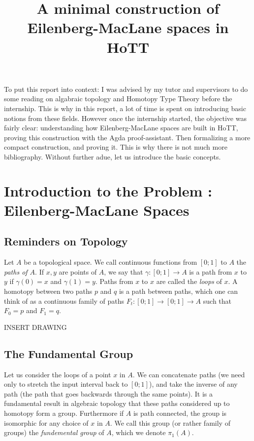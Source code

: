 \documentclass{article}
\title{A minimal construction of Eilenberg-MacLane spaces in HoTT}
\begin{document}
\tableofcontents

\break

To put this report into context: I was advised by my tutor and supervisors to do some reading on algabraic topology and Homotopy Type Theory before the internship. This is why in this report, a lot of time is spent on introducing basic notions from these fields. However once the internship started, the objective was fairly clear: understanding how Eilenberg-MacLane spaces are built in HoTT, proving this construction with the Agda proof-assistant. Then formalizing a more compact construction, and proving it. This is why there is not much more bibliography. Without further adue, let us introduce the basic concepts.

\section{Introduction to the Problem : Eilenberg-MacLane Spaces}

\subsection{Reminders on Topology}

Let $A$ be a topological space. We call continuous functions from $[0;1]$ to $A$ the \emph{paths of $A$}. If $x,y$ are points of $A$, we say that $\gamma : [0;1] \to A$ is a path from $x$ to $y$ if $\gamma(0) = x$ and $\gamma(1) = y$. Paths from $x$ to $x$ are called the \emph{loops} of $x$. A homotopy between two paths $p$ and $q$ is a path between paths, which one can think of as a continuous family of paths $F_{t} : [0;1] \to [0;1] \to A$ such that $F_{0} = p$ and $F_{1} = q$.

INSERT DRAWING

\subsection{The Fundamental Group}

Let us consider the loops of a point $x$ in $A$. We can concatenate paths (we need only to stretch the input interval back to $[0;1]$), and take the inverse of any path (the path that goes backwards through the same points). It is a fundamental result in algebraic topology that these paths considered up to homotopy form a group. Furthermore if $A$ is path connected, the group is isomorphic for any choice of $x$ in $A$. We call this group (or rather family of groups) the \emph{fundemental group} of $A$, which we denote $\pi_{1}(A)$.
\end{document}
